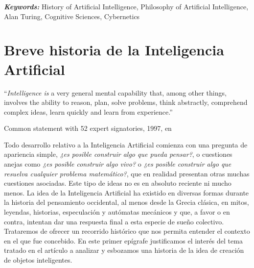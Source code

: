 \documentclass[12pt]{memoir}
\providecommand{\keywords}[2]{
	\textbf{\textit{#1: }} #2
}
\begin{document}
\keywords{Keywords}{History of Artificial Intelligence, Philosophy of Artificial Intelligence, Alan Turing, Cognitive Sciences, Cybernetics}

\newpage
\thispagestyle{empty}




\DoubleSpacing
\begin{KeepFromToc}
  \tableofcontents
\end{KeepFromToc}
\thispagestyle{empty}
\OnehalfSpacing
\newpage

\pagestyle{fancy}
\fancyhf{}
\lhead[]{\thepage}
\rhead[\thepage]{}

\chapter{Breve historia de la Inteligencia Artificial}

\epigraph{``\textit{Intelligence is} a very general mental capability that, among other things, involves the ability to reason, plan, solve problems, think abstractly, comprehend complex ideas, learn quickly and learn from experience.''}{Common statement with 52 expert signatories, 1997, en \cite{intDefs}}

Todo desarrollo relativo a la Inteligencia Artificial comienza con una pregunta de apariencia simple, \textit{¿es posible construir algo que pueda pensar?}, o cuestiones anejas como  \textit{¿es posible construir algo vivo?} o \textit{¿es posible construir algo que resuelva cualquier problema matemático?}, que en realidad presentan otras muchas cuestiones asociadas. Este tipo de ideas no es en absoluto reciente ni mucho menos. La idea de la Inteligencia Artificial ha existido en diversas formas durante la historia del pensamiento occidental, al menos desde la Grecia clásica, en mitos, leyendas, historias, especulación y autómatas mecánicos y que, a favor o en contra, intentan dar una respuesta final a esta especie de sueño colectivo. Trataremos de ofrecer un recorrido histórico que nos permita entender el contexto en el que \cite{Turing1950cmi} fue concebido. En este primer epígrafe justificamos el interés del tema tratado en el artículo a analizar y esbozamos una historia de la idea de creación de objetos inteligentes.
\end{document}
